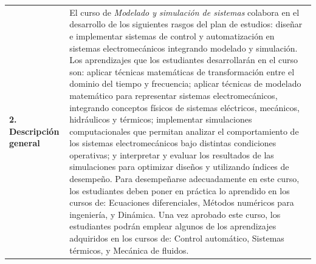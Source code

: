 \documentclass[letterpaper]{article}%
\begin{document}
\begin{tabularx}{\textwidth}{p{3cm}p{13cm}}%
\par\fontsize{12}{14}\selectfont \textbf{\textcolor{parte}{2. Descripción general}}&El curso de \emph{Modelado y simulación de sistemas} colabora en el desarrollo de los siguientes rasgos del plan de estudios: diseñar e implementar sistemas de control y automatización en sistemas electromecánicos integrando modelado y simulación. \newline\newline Los aprendizajes que los estudiantes desarrollarán en el curso son: aplicar técnicas matemáticas de transformación entre el dominio del tiempo y frecuencia; aplicar técnicas de modelado matemático para representar sistemas electromecánicos, integrando conceptos físicos de sistemas eléctricos, mecánicos, hidráulicos y térmicos; implementar simulaciones computacionales que permitan analizar el comportamiento de los sistemas electromecánicos bajo distintas condiciones operativas; y interpretar y evaluar los resultados de las simulaciones para optimizar diseños y utilizando índices de desempeño. \newline\newline Para desempeñarse adecuadamente en este curso, los estudiantes deben poner en práctica lo aprendido en los cursos de: Ecuaciones diferenciales, Métodos numéricos para ingeniería, y Dinámica. \newline\newline Una vez aprobado este curso, los estudiantes podrán emplear algunos de los aprendizajes adquiridos en los cursos de: Control automático, Sistemas térmicos, y Mecánica de fluidos. \\%
\end{tabularx}%
\vspace*{4mm}%
\newline%
\end{document}
